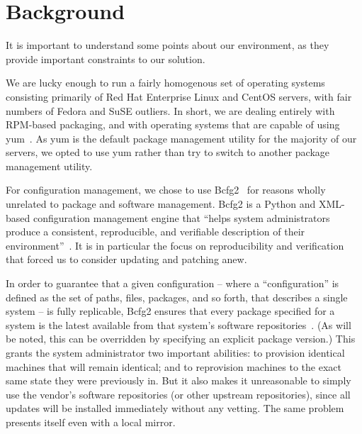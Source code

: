 \section{Background}
\label{sec:background}

It is important to understand some points about our environment, as
they provide important constraints to our solution.

We are lucky enough to run a fairly homogenous set of operating
systems consisting primarily of Red Hat Enterprise Linux and CentOS
servers, with fair numbers of Fedora and SuSE outliers.  In short, we
are dealing entirely with RPM-based packaging, and with operating
systems that are capable of using yum~\cite{Vid11}.  As yum is the
default package management utility for the majority of our servers, we
opted to use yum rather than try to switch to another package
management utility.

For configuration management, we chose to use Bcfg2~\cite{Des11} for
reasons wholly unrelated to package and software management.  Bcfg2 is
a Python and XML-based configuration management engine that ``helps
system administrators produce a consistent, reproducible, and
verifiable description of their environment''~\cite{Des11}.  It is in
particular the focus on reproducibility and verification that forced
us to consider updating and patching anew.

In order to guarantee that a given configuration -- where a
``configuration'' is defined as the set of paths, files, packages, and
so forth, that describes a single system -- is fully replicable, Bcfg2
ensures that every package specified for a system is the latest
available from that system's software repositories~\cite{JLS11}.  (As
will be noted, this can be overridden by specifying an explicit
package version.)  This grants the system administrator two important
abilities: to provision identical machines that will remain identical;
and to reprovision machines to the exact same state they were
previously in.  But it also makes it unreasonable to simply use the
vendor's software repositories (or other upstream repositories), since
all updates will be installed immediately without any vetting.  The
same problem presents itself even with a local mirror.

